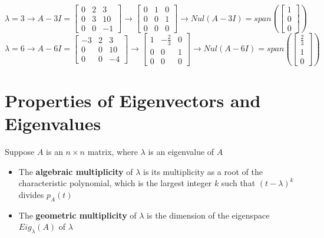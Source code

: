 \begin{enumerate}
\[\]
\[
  \lambda = 3 \rightarrow A - 3I = \begin{bmatrix} 0 & 2 & 3 \\
  0 & 3 & 10 \\ 0 & 0 & -1 \end{bmatrix} \rightarrow 
  \begin{bmatrix} 0 & 1 & 0 \\ 0 & 0 & 1 \\ 0 & 0 & 0 \end{bmatrix}
  \rightarrow Nul(A - 3I) = span(\begin{bmatrix} 1 \\ 0 \\ 0 
  \end{bmatrix})
\]
\[
  \lambda = 6 \rightarrow A - 6I = \begin{bmatrix} -3 & 2 & 3 \\ 
  0 & 0 & 10 \\ 0 & 0 & -4 \end{bmatrix} \rightarrow 
    \begin{bmatrix} 1 & -\frac{2}{3} & 0 \\ 0 & 0 & 1 \\ 0 & 0 & 0 
      \end{bmatrix} \rightarrow Nul(A - 6I) = span(\begin{bmatrix} 
    \frac{2}{3} \\ 1 \\ 0 \end{bmatrix})
\]
\section{Properties of Eigenvectors and Eigenvalues}
Suppose $A$ is an $n \times n$ matrix, where $\lambda$ is an 
eigenvalue of $A$ 
\begin{itemize}
  \item The \textbf{algebraic multiplicity} of $\lambda$ is its 
    multiplicity as a root of the characteristic polynomial, 
    which is the largest integer $k$ such that $(t - \lambda)^k$ 
    divides $p_A(t)$
  \item The \textbf{geometric multiplicity} of $\lambda$ is the 
    dimension of the eigenspace $Eig_\lambda(A)$ of $\lambda$ 
\end{itemize}

\end{enumerate}
